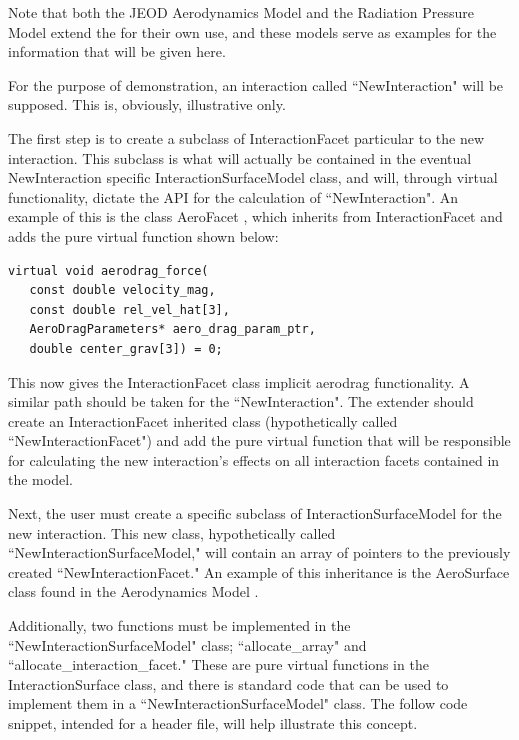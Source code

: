Note that both the JEOD Aerodynamics Model \cite{dynenv:AERODYNAMICS} and the
Radiation Pressure Model \cite{dynenv:RADIATIONPRESSURE} extend the
\ModelDesc for their own use, and these models serve as examples
for the information that will be given here.

For the purpose of demonstration, an interaction called ``NewInteraction" will
be supposed. This is, obviously, illustrative only.

The first step is to create a subclass of InteractionFacet particular to the
new interaction. This subclass is what will actually be contained
in the eventual NewInteraction specific InteractionSurfaceModel class, and
will, through virtual functionality, dictate the API for the calculation
of ``NewInteraction". An example of this is the class AeroFacet 
\cite{dynenv:AERODYNAMICS}, which inherits from InteractionFacet and adds
the pure virtual function shown below:

\begin{verbatim}
virtual void aerodrag_force(
   const double velocity_mag,
   const double rel_vel_hat[3],
   AeroDragParameters* aero_drag_param_ptr, 
   double center_grav[3]) = 0;
\end{verbatim}

This now gives the InteractionFacet class implicit aerodrag functionality.
A similar path should be taken for the ``NewInteraction". The extender
should create an InteractionFacet inherited class (hypothetically called
``NewInteractionFacet") and add the pure virtual
function that will be responsible for calculating the new interaction's effects
on all interaction facets contained in the model.

Next, the user must create a specific subclass of InteractionSurfaceModel
for the new interaction. This new class, hypothetically called 
``NewInteractionSurfaceModel," will contain an array of pointers to the
previously created ``NewInteractionFacet." An example of this
inheritance is the AeroSurface class found in the Aerodynamics Model
\cite{dynenv:AERODYNAMICS}.

Additionally, two functions must be implemented in the 
``NewInteractionSurfaceModel" class; ``allocate\_array" and
``allocate\_interaction\_facet." These are pure virtual functions
in the InteractionSurface class, and there is standard code that can
be used to implement them in a ``NewInteractionSurfaceModel" class. 
The follow code snippet, intended for a header file, will help illustrate
this concept.

